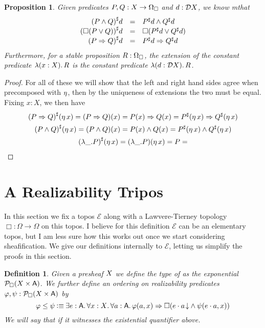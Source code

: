 \documentclass[11pt]{article}
\newtheorem{prop}[thrm]{Proposition}
\newtheorem{defn}[thrm]{Definition}
\begin{document}
\begin{prop}
  Given predicates \(P,Q : X \to \Omega_\Box\) and \(d : \mathcal{D}{X}\), we know  mthat
  \[\begin{array}{rll}
    {({P}\land{Q})}^\sharp d &=& {{P}^\sharp d}\land{{Q}^\sharp d} \\
    {(\Box{({P}\lor{Q})})}^\sharp d &=& \Box{({{P}^\sharp d}\lor{{Q}^\sharp d})}\\
    {({P}\Rightarrow{Q})}^\sharp d &=& {{P}^\sharp d}\Rightarrow{{Q}^\sharp d}
  \end{array} \]
Furthermore, for a stable proposition \(R : \Omega_\Box\), the extension of the
constant predicate \({\mathop{\lambda({x:X}).}{R}}\) is the constant predicate
\({\mathop{\lambda({d:\mathcal{D}{X}}).}{R}}\).
\end{prop}
\begin{proof}
  For all of these we will show that the left and right hand sides agree when
  precomposed with \(\eta\), then by the uniqueness of extensions the two
  must be equal.
  Fixing \(x : X\), we then have
  \begin{gather*}
    {({P}\Rightarrow{Q})}^\sharp(\eta\,{x})
    = ({P}\Rightarrow{Q})(x)
    = {P(x)}\Rightarrow{Q(x)}
    = {{P}^\sharp(\eta\,{x})}\Rightarrow{{Q}^\sharp(\eta\,{x})}
    \\
    {({P}\land{Q})}^\sharp(\eta\,{x})
    = ({P}\land{Q})(x)
    = {P(x)}\land{Q(x)}
    = {{P}^\sharp(\eta\,{x})}\land{{Q}^\sharp(\eta\,{x})}
    \\
    {(\lambda\_.P)}^\sharp(\eta\,{x})
    = (\lambda\_.P)(\eta\,{x})
    = P
    =
  \end{gather*}
\end{proof}



\section{A Realizability Tripos}

In this section we fix a topos \(\mathcal{E}\) along with a Lawvere-Tierney
topology \(\Box : \Omega \to \Omega\) on this topos.
%
I believe for this definition \(\mathcal{E}\) can be an elementary topos,
but I am less sure how this works out once we start considering sheafification.
%
We give our definitions internally to \(\mathcal{E}\), letting us simplify
the proofs in this section.


\begin{defn}\label{defn:tripos-predicates-and-ordering}
  Given a presheaf \(X\) we define the type of  as the exponential \(\mathcal{P}_{\Box}{({X}\times{\ensuremath{\mathsf{A}}})}\).
  We further define an ordering on realizability
  predicates~\(\varphi, \psi : \mathcal{P}_{\Box}{({X}\times{\ensuremath{\mathsf{A}}})}\) by
  \[
    \varphi \leq \psi
    \IsDefined
    \IExists{e : \A}{
      \IForall{x : \X}{
        \IForall{a : \A}{
          \IImplies%
            {\varphi(a,x)}%
            {\IBox{(
              \IAnd%
              {\ITotal{\IAp{e}{a}}}%
              {\psi(\IAp{e}{a}, x)}
            )}}
        }
      }
    }
  \]
  We will say that  if
  it witnesses the existential quantifier above.
\end{defn}
\end{document}
